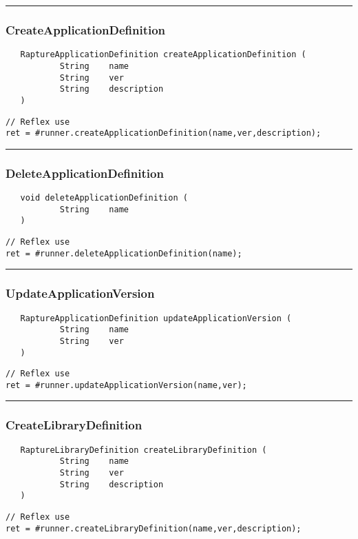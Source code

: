 \rule{15cm}{2pt}
\subsubsection{CreateApplicationDefinition}
\label{Api:CreateApplicationDefinition}
\begin{verbatim}
   RaptureApplicationDefinition createApplicationDefinition (
           String    name
           String    ver
           String    description
   )
\end{verbatim}
\begin{lstlisting}[language=reflex]
// Reflex use
ret = #runner.createApplicationDefinition(name,ver,description);
\end{lstlisting}



\rule{15cm}{2pt}
\subsubsection{DeleteApplicationDefinition}
\label{Api:DeleteApplicationDefinition}
\begin{verbatim}
   void deleteApplicationDefinition (
           String    name
   )
\end{verbatim}
\begin{lstlisting}[language=reflex]
// Reflex use
ret = #runner.deleteApplicationDefinition(name);
\end{lstlisting}



\rule{15cm}{2pt}
\subsubsection{UpdateApplicationVersion}
\label{Api:UpdateApplicationVersion}
\begin{verbatim}
   RaptureApplicationDefinition updateApplicationVersion (
           String    name
           String    ver
   )
\end{verbatim}
\begin{lstlisting}[language=reflex]
// Reflex use
ret = #runner.updateApplicationVersion(name,ver);
\end{lstlisting}



\rule{15cm}{2pt}
\subsubsection{CreateLibraryDefinition}
\label{Api:CreateLibraryDefinition}
\begin{verbatim}
   RaptureLibraryDefinition createLibraryDefinition (
           String    name
           String    ver
           String    description
   )
\end{verbatim}
\begin{lstlisting}[language=reflex]
// Reflex use
ret = #runner.createLibraryDefinition(name,ver,description);
\end{lstlisting}



